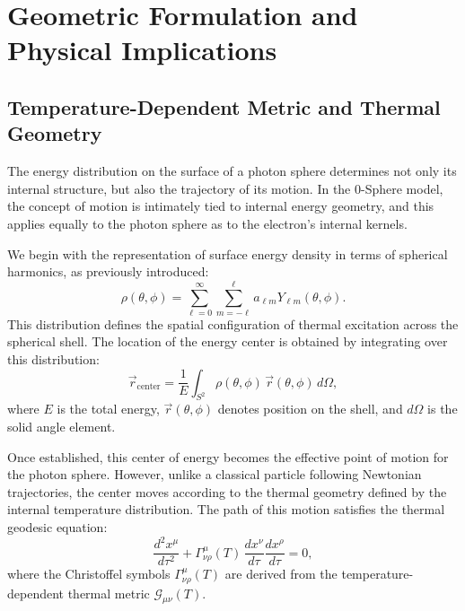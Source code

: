 \documentclass[%
 reprint,
 amsmath,amssymb,
 aps,
]{revtex4-1}
\numberwithin{equation}{section}%
\begin{document}
\section{Geometric Formulation and Physical Implications}
\label{sec:geometric_formulation}

\subsection{Temperature-Dependent Metric and Thermal Geometry}
\label{subsec:temperature_dependent_metric}

The energy distribution on the surface of a photon sphere determines not only its internal structure, but also the trajectory of its motion. In the 0-Sphere model, the concept of motion is intimately tied to internal energy geometry, and this applies equally to the photon sphere as to the electron’s internal kernels.

We begin with the representation of surface energy density in terms of spherical harmonics, as previously introduced:
\begin{equation} \label{eq:rho_expansion}
\rho(\theta, \phi) = \sum_{\ell=0}^{\infty} \sum_{m=-\ell}^{\ell} a_{\ell m} Y_{\ell m}(\theta, \phi).
\end{equation}
This distribution defines the spatial configuration of thermal excitation across the spherical shell. The location of the energy center is obtained by integrating over this distribution:
\begin{equation} \label{eq:center_position}
\vec{r}_{\text{center}} = \frac{1}{E} \int_{S^2} \rho(\theta, \phi) \, \vec{r}(\theta, \phi) \, d\Omega,
\end{equation}
where $E$ is the total energy, $\vec{r}(\theta, \phi)$ denotes position on the shell, and $d\Omega$ is the solid angle element.

Once established, this center of energy becomes the effective point of motion for the photon sphere. However, unlike a classical particle following Newtonian trajectories, the center moves according to the thermal geometry defined by the internal temperature distribution. The path of this motion satisfies the thermal geodesic equation:
\begin{equation} \label{eq:photon_thermal_geodesic}
\frac{d^2 x^\mu}{d\tau^2} + \Gamma^\mu_{\nu\rho}(T) \, \frac{dx^\nu}{d\tau} \frac{dx^\rho}{d\tau} = 0,
\end{equation}
where the Christoffel symbols $\Gamma^\mu_{\nu\rho}(T)$ are derived from the temperature-dependent thermal metric $\mathcal{G}_{\mu\nu}(T)$.
\end{document}
